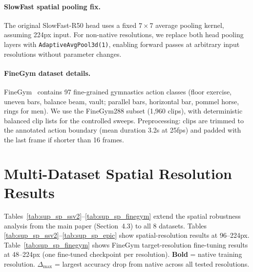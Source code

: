 \documentclass[runningheads]{llncs}
\begin{document}
\paragraph{SlowFast spatial pooling fix.}
The original SlowFast-R50 head uses a fixed $7\times7$ average pooling kernel, assuming 224px input. For non-native resolutions, we replace both head pooling layers with \texttt{AdaptiveAvgPool3d(1)}, enabling forward passes at arbitrary input resolutions without parameter changes.

\paragraph{FineGym dataset details.}
FineGym~\cite{shao2020finegym} contains 97 fine-grained gymnastics action classes (floor exercise, uneven bars, balance beam, vault; parallel bars, horizontal bar, pommel horse, rings for men). We use the FineGym288 subset (1,960 clips), with deterministic balanced clip lists for the controlled sweeps. Preprocessing: clips are trimmed to the annotated action boundary (mean duration 3.2s at 25fps) and padded with the last frame if shorter than 16 frames.

\section{Multi-Dataset Spatial Resolution Results}
\label{sec:sup_spatial}

Tables~\ref{tab:sup_sp_ssv2}--\ref{tab:sup_sp_finegym} extend the spatial robustness analysis from the main paper (Section~4.3) to all 8 datasets. Tables \ref{tab:sup_sp_ssv2}--\ref{tab:sup_sp_epic} show spatial-resolution results at 96--224px. Table~\ref{tab:sup_sp_finegym} shows FineGym target-resolution fine-tuning results at 48--224px (one fine-tuned checkpoint per resolution). \textbf{Bold} = native training resolution. $\Delta_\text{max}$ = largest accuracy drop from native across all tested resolutions.
\end{document}
